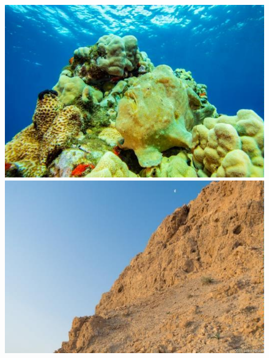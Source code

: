 \documentclass[final]{cvpr}
\begin{document}
\begin{figure}[tp]
{\begin{minipage}[htbp]{.18\linewidth}
    \end{minipage}
}
\subfigure
{
 	\begin{minipage}[htbp]{.18\linewidth}
        \centering
        \includegraphics[scale=0.25]{COD_Zh_translate/figures/example3.png}
        \hspace{5mm} %
    \end{minipage}
}
\subfigure
{
 	\begin{minipage}[htbp]{.18\linewidth}
        \centering
        \includegraphics[scale=0.25]{COD_Zh_translate/figures/example4.png}
        \hspace{5mm} %
    \end{minipage}
}
\subfigure
{
 	\begin{minipage}[htbp]{.18\linewidth}
        \centering

\end{minipage}}
\end{figure}
\end{document}
